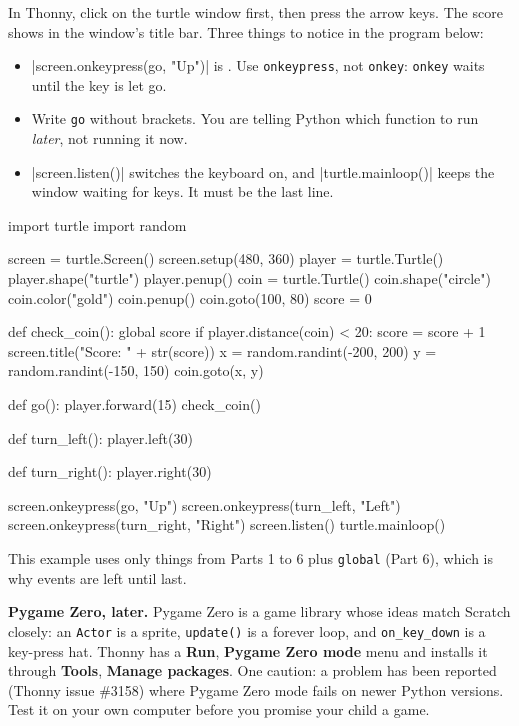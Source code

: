 In Thonny, click on the turtle window first, then press the arrow keys. The score shows in the window's title bar. Three things to notice in the program below:
\begin{itemize}
  \item \py|screen.onkeypress(go, "Up")| is . Use \texttt{onkeypress}, not \texttt{onkey}: \texttt{onkey} waits until the key is let go.
  \item Write \texttt{go} without brackets. You are telling Python which function to run \emph{later}, not running it now.
  \item \py|screen.listen()| switches the keyboard on, and \py|turtle.mainloop()| keeps the window waiting for keys. It must be the last line.
\end{itemize}
\begin{code}
import turtle
import random

screen = turtle.Screen()
screen.setup(480, 360)
player = turtle.Turtle()
player.shape("turtle")
player.penup()
coin = turtle.Turtle()
coin.shape("circle")
coin.color("gold")
coin.penup()
coin.goto(100, 80)
score = 0

def check_coin():
    global score
    if player.distance(coin) < 20:
        score = score + 1
        screen.title("Score: " + str(score))
        x = random.randint(-200, 200)
        y = random.randint(-150, 150)
        coin.goto(x, y)

def go():
    player.forward(15)
    check_coin()

def turn_left():
    player.left(30)

def turn_right():
    player.right(30)

screen.onkeypress(go, "Up")
screen.onkeypress(turn_left, "Left")
screen.onkeypress(turn_right, "Right")
screen.listen()
turtle.mainloop()
\end{code}

This example uses only things from Parts 1 to 6 plus \texttt{global} (Part 6), which is why events are left until last.

\textbf{Pygame Zero, later.} Pygame Zero is a game library whose ideas match Scratch closely: an \texttt{Actor} is a sprite, \texttt{update()} is a forever loop, and \texttt{on\_key\_down} is a key-press hat. Thonny has a \textbf{Run}, \textbf{Pygame Zero mode} menu and installs it through \textbf{Tools}, \textbf{Manage packages}. One caution: a problem has been reported (Thonny issue \#3158) where Pygame Zero mode fails on newer Python versions. Test it on your own computer before you promise your child a game.

